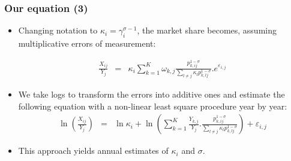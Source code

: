 \documentclass{beamer}
\begin{document}
\begin{frame}[plain]\frametitle{Our equation (3)}

\begin{itemize}
\item Changing notation to $\kappa_i=\gamma_i^{\sigma-1}$, the market share becomes, assuming multiplicative errors of measurement:


\begin{eqnarray}
\frac{{{X}_{ij}}}{{{Y}_{j}}} & = & {{\kappa }_{i}}\sum\limits_{k=1}^{K}{{{\omega }_{k,j}}}\frac{p_{k,ij}^{1-\sigma }}{\sum\limits_{l\ne j}{{{\kappa }_{l}}}p_{k,lj}^{1-\sigma }}.{{e}^{{{\varepsilon }_{i,j}}}} \nonumber
\end{eqnarray}

\item We take logs to transform the errors into additive ones and estimate the following equation with a non-linear least square procedure year by year:
\begin{eqnarray}
\ln \left( \frac{{{X}_{ij}}}{{{Y}_{j}}} \right) & = & \ln {{\kappa }_{i}} +\ln \left( \sum\limits_{k=1}^{K}{\frac{{{Y}_{k,j}}}{{{Y}_{j}}}.}\frac{p_{k,ij}^{1-\sigma }}{\sum\limits_{l\ne j}{{{\kappa }_{l}}}p_{k,lj}^{1-\sigma }} \right) +{{\varepsilon }_{i,j}}
\end{eqnarray}

\item This approach yields annual estimates of ${{\kappa }_{i}}$ and $\sigma $.
\end{itemize}
\end{frame}
\end{document}
